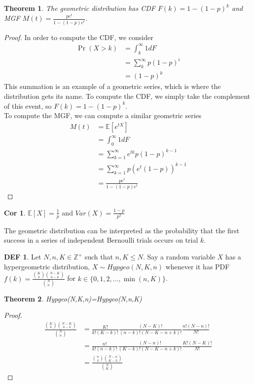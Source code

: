 \documentclass{article}
\newtheorem{theorem}{Theorem}
\theoremstyle{definition}\newtheorem{definition}{DEF}
\theoremstyle{definition}\newtheorem{example}{Ex}
\theoremstyle{lemma}\newtheorem{lemma}{Lemma}
\theoremstyle{corrolary}\newtheorem{corrolary}{Cor}
\begin{document}
\begin{theorem}
The geometric distribution has CDF $F(k)=1-(1-p)^k$ and MGF $M(t)=\frac{pe^t}{1-(1-p)e^t}$.
\end{theorem}
\begin{proof}
In order to compute the CDF, we consider
\begin{align*}
\Pr(X>k)&=\int_k^\infty 1dF\\
&=\sum_k^\infty p(1-p)^i\\
&=(1-p)^k
\end{align*}
This summation is an example of a geometric series, which is where the distribution gets its name.
To compute the CDF, we simply take the complement of this event, so $F(k)=1-(1-p)^k$.\\
To compute the MGF, we can compute a similar geometric series
\begin{align*}
M(t)&=\mathbb{E}[e^{tX}]\\
&=\int_0^\infty 1dF\\
&=\sum_{k=1}^\infty e^{tk}p(1-p)^{k-1}\\
&=\sum_{k=1}^\infty p(e^t(1-p))^{k-1}\\
&=\frac{pe^t}{1-(1-p)e^t}
\end{align*}
\end{proof}
\begin{corrolary}
$\mathbb{E}[X]=\frac{1}{p}$ and $Var(X)=\frac{1-p}{p^2}$
\end{corrolary}

The geometric distribution can be interpreted as the probability that the first success in a series of independent Bernoulli trials occurs on trial $k$.

\begin{definition}
Let $N,n,K\in \mathbb{Z}^+$ such that $n,K\leq N$.
Say a  random variable $X$ has a hypergeometric distribution, $X\sim Hypgeo(N,K,n)$ whenever it has PDF $f(k)=\frac{\binom{K}{k}\binom{N-K}{n-k}}{\binom{N}{n}}$ for $k\in \{0,1,2,...,\min(n,K)\}$.
\end{definition}

\begin{theorem}
Hypgeo(N,K,n)=Hypgeo(N,n,K)
\end{theorem}
\begin{proof}
\begin{align*}
\frac{\binom{K}{k}\binom{N-K}{n-k}}{\binom{N}{n}}&=\frac{K!}{k!(K-k)!}\frac{(N-K)!}{(n-k)!(N-K-n+k)!}\frac{n!(N-n)!}{N!}\\
&=\frac{n!}{k!(n-k)!}\frac{(N-n)!}{(K-k)!(N-K-n+k)!}\frac{K!(N-K)!}{N!}\\
&=\frac{\binom{n}{k}\binom{N-n}{K-k}}{\binom{N}{K}}
\end{align*}
\end{proof}
\end{document}
